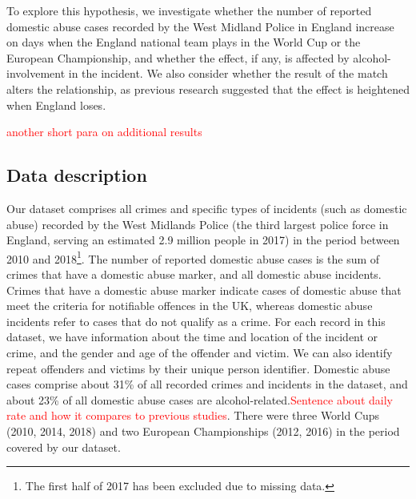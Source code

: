 \documentclass[12pt, letterpaper]{article}
\begin{document}





To explore this hypothesis, we investigate whether the number of reported domestic abuse cases recorded by the West Midland Police in England increase on days when the England national team plays in the World Cup or the European Championship, and whether the effect, if any, is affected by alcohol-involvement in the incident. We also consider whether the result of the match alters the relationship, as previous research suggested that the effect is heightened when England loses\autocite{Kirby2014}.

\textcolor{red}{another short para on additional results}



\subsection{Data description}

Our dataset comprises all crimes and specific types of incidents (such as domestic abuse) recorded by the West Midlands Police (the third largest police force in England\autocite{Homeoffice}, serving an estimated 2.9 million people in 2017\autocite{populationfigure}) in the period between 2010 and 2018\footnote{The first half of 2017 has been excluded due to missing data.}. The number of reported domestic abuse cases is the sum of crimes that have a domestic abuse marker, and all domestic abuse incidents. Crimes that have a domestic abuse marker indicate cases of domestic abuse that meet the criteria for notifiable offences in the UK, whereas domestic abuse incidents refer to cases that do not qualify as a crime. For each record in this dataset, we have information about the time and location of the incident or crime, and the gender and age of the offender and victim. We can also identify repeat offenders and victims by their unique person identifier. Domestic abuse cases comprise about 31\% of all recorded crimes and incidents in the dataset, and about 23\% of all domestic abuse cases are alcohol-related.\textcolor{red}{Sentence about daily rate and how it compares to previous studies}. There were three World Cups (2010, 2014, 2018) and two European Championships (2012, 2016) in the period covered by our dataset. 
\end{document}
